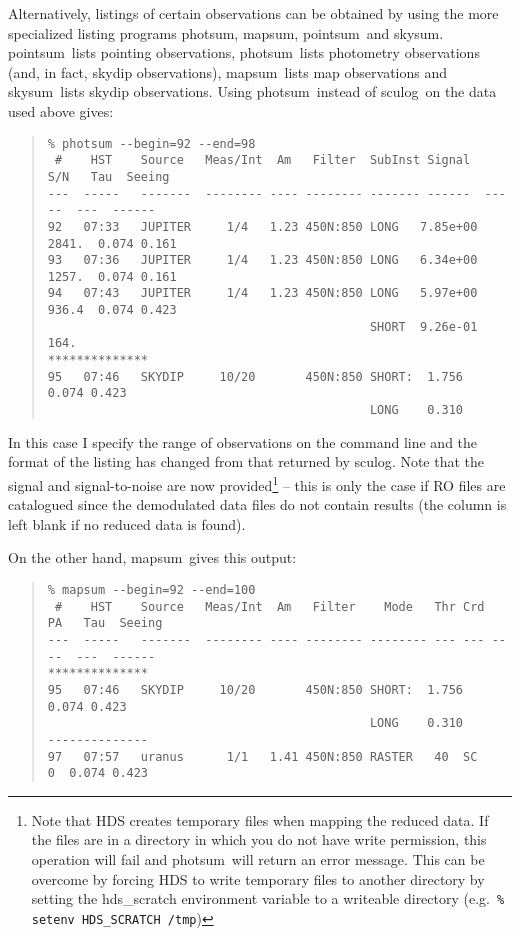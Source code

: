 \documentclass[twoside,11pt]{article}
\newcommand{\task}[1]{{\sf #1}}
\newcommand{\sculog}{\htmlref{\task{sculog}}{SCULOG}}
\newcommand{\photsum}{\htmlref{\task{photsum}}{PHOTSUM}}
\newcommand{\mapsum}{\htmlref{\task{mapsum}}{MAPSUM}}
\newcommand{\skysum}{\htmlref{\task{skysum}}{SKYSUM}}
\newcommand{\pointsum}{\htmlref{\task{pointsum}}{POINTSUM}}
\newenvironment{myquote}{\begin{quote}\begin{small}}{\end{small}\end{quote}}
\newcommand{\htmlref}[2]{#1}
\begin{document}
Alternatively, listings of certain observations can be obtained by using the
more specialized listing programs \photsum, \mapsum, \pointsum\ and
\skysum. \pointsum\ lists pointing observations, \photsum\ lists photometry
observations (and, in fact, skydip observations), \mapsum\ lists map
observations and \skysum\ lists skydip observations. Using
\photsum\ instead of \sculog\ on the data used above gives:
\begin{myquote}
\begin{verbatim}
% photsum --begin=92 --end=98
 #    HST    Source   Meas/Int  Am   Filter  SubInst Signal   S/N   Tau  Seeing
---  -----   -------  -------- ---- -------- ------- ------  -----  ---  ------
92   07:33   JUPITER     1/4   1.23 450N:850 LONG   7.85e+00 2841.  0.074 0.161
93   07:36   JUPITER     1/4   1.23 450N:850 LONG   6.34e+00 1257.  0.074 0.161
94   07:43   JUPITER     1/4   1.23 450N:850 LONG   5.97e+00 936.4  0.074 0.423
                                             SHORT  9.26e-01 164.
**************
95   07:46   SKYDIP     10/20       450N:850 SHORT:  1.756          0.074 0.423
                                             LONG    0.310
\end{verbatim}
\end{myquote}
In this case I specify the range of observations on the command line and
the format of the listing has changed from that returned by \sculog. Note that
the signal and signal-to-noise are now provided\footnote{Note that HDS creates
temporary files when mapping the reduced data. If the files are in a directory
in which you do not have write permission, this operation will fail and 
\photsum\ will return an error message. This can be overcome by forcing 
HDS to write temporary files to another directory by setting the 
{\sc hds\_scratch} environment variable to a writeable directory 
(e.g.\ {\tt \% setenv HDS\_SCRATCH /tmp})} -- this is only the case 
if RO files are catalogued since the demodulated data files do not
contain results (the column is left blank if no reduced data is found).

On the other hand, \mapsum\ gives this output:
\begin{myquote}
\begin{verbatim}
% mapsum --begin=92 --end=100
 #    HST    Source   Meas/Int  Am   Filter    Mode   Thr Crd  PA   Tau  Seeing
---  -----   -------  -------- ---- -------- -------- --- --- ----  ---  ------
**************
95   07:46   SKYDIP     10/20       450N:850 SHORT:  1.756          0.074 0.423
                                             LONG    0.310
--------------
97   07:57   uranus      1/1   1.41 450N:850 RASTER   40  SC     0  0.074 0.423
\end{verbatim}
\end{myquote}
\end{document}

